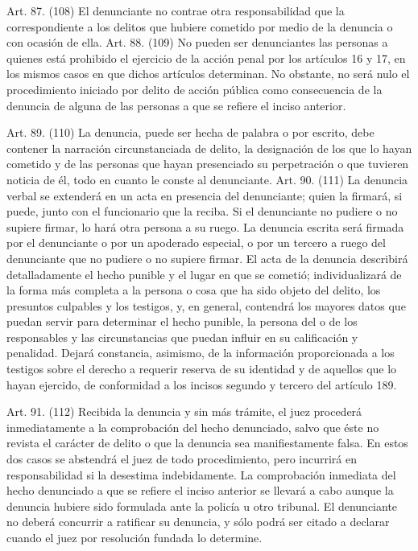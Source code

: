     Art. 87. (108) El denunciante no contrae otra responsabilidad que la correspondiente a los delitos que hubiere cometido por medio de la denuncia o con ocasión de ella.
    Art. 88. (109) No pueden ser denunciantes las personas a quienes está prohibido el ejercicio de la acción penal por los artículos 16 y 17, en los mismos casos en que dichos artículos determinan.
    No obstante, no será nulo el procedimiento iniciado por delito de acción pública como consecuencia de la denuncia de alguna de las personas a que se refiere el inciso anterior.

    Art. 89. (110) La denuncia, puede ser hecha de palabra o por escrito, debe contener la narración circunstanciada de delito, la designación de los que lo hayan cometido y de las personas que hayan presenciado su perpetración o que tuvieren noticia de él, todo en cuanto le conste al denunciante.
    Art. 90. (111) La denuncia verbal se extenderá en un acta en presencia del denunciante; quien la firmará, si puede, junto con el funcionario que la reciba. Si el denunciante no pudiere o no supiere firmar, lo hará otra persona a su ruego.
    La denuncia escrita será firmada por el denunciante o por un apoderado especial, o por un tercero a ruego del denunciante que no pudiere o no supiere firmar.
    El acta de la denuncia describirá detalladamente el hecho punible y el lugar en que se cometió; individualizará de la forma más completa a la persona o cosa que ha sido objeto del delito, los presuntos culpables y los testigos, y, en general, contendrá los mayores datos que puedan servir para determinar el hecho punible, la persona del o de los responsables y las circunstancias que puedan influir en su calificación y penalidad. Dejará constancia, asimismo, de la información proporcionada a los testigos sobre el derecho a requerir reserva de su identidad y de aquellos que lo hayan ejercido, de conformidad a los incisos segundo y tercero del artículo 189.


    Art. 91. (112) Recibida la denuncia y sin más trámite, el juez procederá inmediatamente a la comprobación del hecho denunciado, salvo que éste no revista el carácter de delito o que la denuncia sea manifiestamente falsa. En estos dos casos se abstendrá el juez de todo procedimiento, pero incurrirá en responsabilidad si la desestima indebidamente.
    La comprobación inmediata del hecho denunciado a que se refiere el inciso anterior se llevará a cabo aunque la denuncia hubiere sido formulada ante la policía u otro tribunal. El denunciante no deberá concurrir a ratificar su denuncia, y sólo podrá ser citado a declarar cuando el juez por resolución fundada lo determine.

